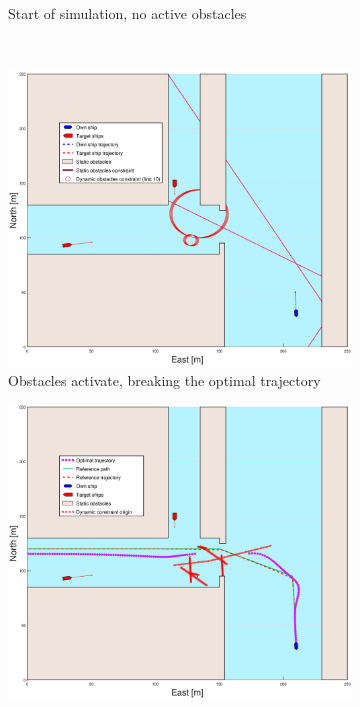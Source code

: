 \begin{figure}[b]
\begin{subfigure}{0.499\textwidth}
        \caption{Start of simulation, no active obstacles}
    \end{subfigure}
    \hfill
    \\
    \begin{subfigure}{0.49\textwidth}
        \centering
        \includegraphics[width=\textwidth]{Images/Figures/Extra_Stuff/BlockedPath_Pos_t=2}
        \caption{Obstacles activate, breaking the optimal trajectory}
    \end{subfigure}
    \begin{subfigure}{0.499\textwidth}
        \centering
        \includegraphics[width=\textwidth]{Images/Figures/Extra_Stuff/BlockedPath_Wopt_t=2}

\end{subfigure}
\end{figure}
